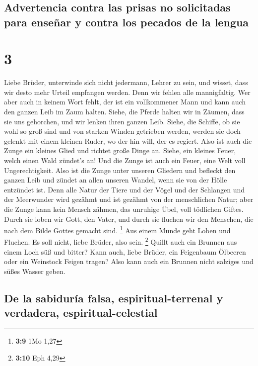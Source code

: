 \hypertarget{advertencia-contra-las-prisas-no-solicitadas-para-enseuxf1ar-y-contra-los-pecados-de-la-lengua}{%
\subsection{Advertencia contra las prisas no solicitadas para enseñar y
contra los pecados de la
lengua}\label{advertencia-contra-las-prisas-no-solicitadas-para-enseuxf1ar-y-contra-los-pecados-de-la-lengua}}

\hypertarget{section-2}{%
\section{3}\label{section-2}}

 Liebe Brüder, unterwinde sich nicht jedermann, Lehrer zu
sein, und wisset, dass wir desto mehr Urteil empfangen werden.
 Denn wir fehlen alle mannigfaltig. Wer aber auch in
keinem Wort fehlt, der ist ein vollkommener Mann und kann auch den
ganzen Leib im Zaum halten.  Siehe, die Pferde halten wir
in Zäumen, dass sie uns gehorchen, und wir lenken ihren ganzen Leib.
 Siehe, die Schiffe, ob sie wohl so groß sind und von
starken Winden getrieben werden, werden sie doch gelenkt mit einem
kleinen Ruder, wo der hin will, der es regiert.  Also ist
auch die Zunge ein kleines Glied und richtet große Dinge an. Siehe, ein
kleines Feuer, welch einen Wald zündet's an!  Und die
Zunge ist auch ein Feuer, eine Welt voll Ungerechtigkeit. Also ist die
Zunge unter unseren Gliedern und befleckt den ganzen Leib und zündet an
allen unseren Wandel, wenn sie von der Hölle entzündet ist.
 Denn alle Natur der Tiere und der Vögel und der Schlangen
und der Meerwunder wird gezähmt und ist gezähmt von der menschlichen
Natur;  aber die Zunge kann kein Mensch zähmen, das
unruhige Übel, voll tödlichen Giftes.  Durch sie loben wir
Gott, den Vater, und durch sie fluchen wir den Menschen, die nach dem
Bilde Gottes gemacht sind. \footnote{\textbf{3:9} 1Mo 1,27}
 Aus einem Munde geht Loben und Fluchen. Es soll nicht,
liebe Brüder, also sein. \footnote{\textbf{3:10} Eph 4,29}
 Quillt auch ein Brunnen aus einem Loch süß und bitter?
 Kann auch, liebe Brüder, ein Feigenbaum Ölbeeren oder
ein Weinstock Feigen tragen? Also kann auch ein Brunnen nicht salziges
und süßes Wasser geben.

\hypertarget{de-la-sabiduruxeda-falsa-espiritual-terrenal-y-verdadera-espiritual-celestial}{%
\subsection{De la sabiduría falsa, espiritual-terrenal y verdadera,
espiritual-celestial}\label{de-la-sabiduruxeda-falsa-espiritual-terrenal-y-verdadera-espiritual-celestial}}

